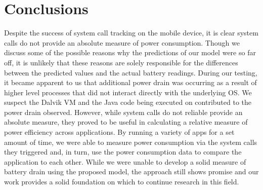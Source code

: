 \documentclass[11pt]{article}
\begin{document}
\section{Conclusions}

Despite the success of system call tracking on the mobile device, it is clear system calls do not provide an absolute measure of power consumption.  Though
we discuss some of the possible reasons why the predictions of our model were so far off, it is unlikely that these reasons are solely responsible for the
differences between the predicted values and the actual battery readings.  During our testing, it became apparent to us that additional power drain was
occurring as a result of higher level processes that did not interact directly with the underlying OS.  We suspect the Dalvik VM and the Java code being
executed on contributed to the power drain observed.  However, while system calls do not reliable provide an absolute measure, they proved to be useful in
calculating a relative measure of power efficiency across applications.  By running a variety of apps for a set amount of time, we were able to measure
power consumption via the system calls they triggered and, in turn, use the power consumption data to compare the application to each other.  While we were
unable to develop a solid measure of battery drain using the proposed model, the approach still shows promise and our work provides a solid foundation on which
to continue research in this field.



\end{document}
